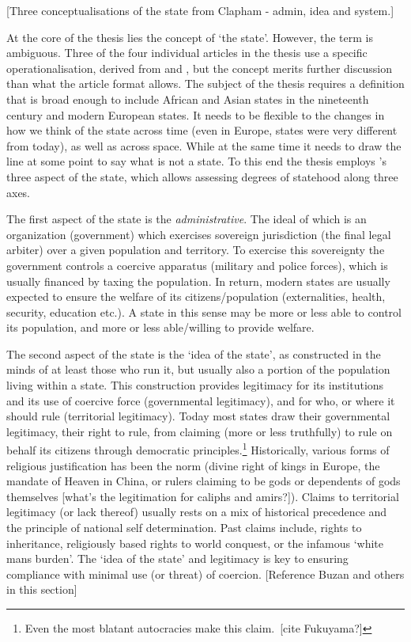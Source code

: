 \documentclass[12pt]{article}
\begin{document}
[Three conceptualisations of the state from Clapham - admin, idea and system.]

At the core of the thesis lies the concept of `the state'. However, the term is
ambiguous. Three of the four individual articles in the thesis use a specific
operationalisation, derived from \citet{Butcher2019} and \citet{Butcher2017},
but the concept merits further discussion than what the article format allows.
The subject of the thesis requires a definition that is broad enough to include
African and Asian states in the nineteenth century and modern European states.
It needs to be flexible to the changes in how we think of the state across time
(even in Europe, states were very different from today), as well as across
space. While at the same time it needs to draw the line at some point to say
what is not a state. To this end the thesis employs \citet{Clapham1996}'s three
aspect of the state, which allows assessing degrees of statehood along three
axes.

The first aspect of the state is the \textit{administrative}. The ideal of
which is an organization (government) which exercises sovereign jurisdiction
(the final legal arbiter) over a given population and territory. To exercise
this sovereignty the government controls a coercive apparatus (military and
police forces), which is usually financed by taxing the population. In return,
modern states are usually expected to ensure the welfare of its
citizens/population (externalities, health, security, education etc.). A state
in this sense may be more or less able to control its population, and more or
less able/willing to provide welfare.

The second aspect of the state is the `idea of the state', as constructed in
the minds of at least those who run it, but usually also a portion of the
population living within a state. This construction provides legitimacy for its
institutions and its use of coercive force (governmental legitimacy), and for
who, or where it should rule (territorial legitimacy). Today most states draw
their governmental legitimacy, their right to rule, from claiming (more or less
truthfully) to rule on behalf its citizens through democratic
principles.\footnote{Even the most blatant autocracies make this claim. [cite
Fukuyama?]} Historically, various forms of religious justification has been the
norm (divine right of kings in Europe, the mandate of Heaven in China, or rulers
claiming to be gods or dependents of gods themselves [what's the legitimation
for caliphs and amirs?]). Claims to territorial legitimacy (or lack thereof)
usually rests on a mix of historical precedence and the principle of national
self determination. Past claims include, rights to inheritance, religiously
based rights to world conquest, or the infamous `white mans burden'. The
`idea of the state' and legitimacy is key to ensuring compliance with minimal
use (or threat) of coercion. [Reference Buzan and others in this section]
\end{document}
